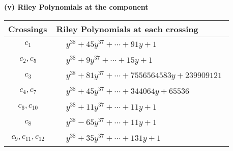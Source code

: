 \documentclass[1p]{elsarticle_modified}
\theoremstyle{definition}
\begin{document}
\flushleft \textbf{(v) Riley Polynomials at the component}\newline \\
\begin{tabular}{m{50pt}|m{274pt}}
Crossings & \hspace{64pt}Riley Polynomials at each crossing \\
\hline $$\begin{aligned}c_{1}\end{aligned}$$&$\begin{aligned}
&y^{38}+45 y^{37}+\cdots+91 y+1
\end{aligned}$\\
\hline $$\begin{aligned}c_{2},c_{5}\end{aligned}$$&$\begin{aligned}
&y^{38}+9 y^{37}+\cdots+15 y+1
\end{aligned}$\\
\hline $$\begin{aligned}c_{3}\end{aligned}$$&$\begin{aligned}
&y^{38}+81 y^{37}+\cdots+7556564583 y+239909121
\end{aligned}$\\
\hline $$\begin{aligned}c_{4},c_{7}\end{aligned}$$&$\begin{aligned}
&y^{38}+45 y^{37}+\cdots+344064 y+65536
\end{aligned}$\\
\hline $$\begin{aligned}c_{6},c_{10}\end{aligned}$$&$\begin{aligned}
&y^{38}+11 y^{37}+\cdots+11 y+1
\end{aligned}$\\
\hline $$\begin{aligned}c_{8}\end{aligned}$$&$\begin{aligned}
&y^{38}-65 y^{37}+\cdots+11 y+1
\end{aligned}$\\
\hline $$\begin{aligned}c_{9},c_{11},c_{12}\end{aligned}$$&$\begin{aligned}
&y^{38}+35 y^{37}+\cdots+131 y+1
\end{aligned}$\\
\hline
\end{tabular}\\~\\
\end{document}
